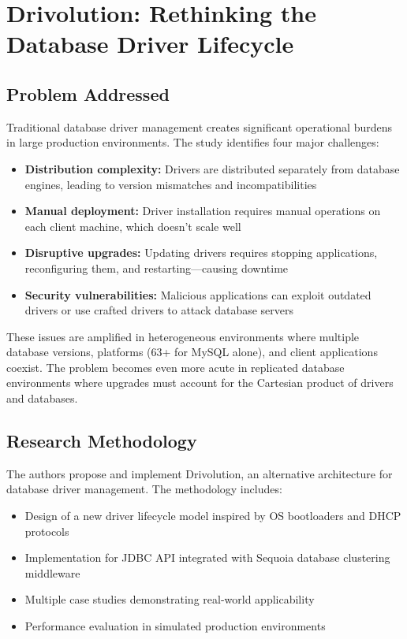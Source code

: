 \section{Drivolution: Rethinking the Database Driver Lifecycle}

\subsection{Problem Addressed}

Traditional database driver management creates significant operational burdens in large production environments. The study identifies four major challenges:

\begin{itemize}
    \item \textbf{Distribution complexity:} Drivers are distributed separately from database engines, leading to version mismatches and incompatibilities
    \item \textbf{Manual deployment:} Driver installation requires manual operations on each client machine, which doesn't scale well
    \item \textbf{Disruptive upgrades:} Updating drivers requires stopping applications, reconfiguring them, and restarting—causing downtime
    \item \textbf{Security vulnerabilities:} Malicious applications can exploit outdated drivers or use crafted drivers to attack database servers
\end{itemize}

These issues are amplified in heterogeneous environments where multiple database versions, platforms (63+ for MySQL alone), and client applications coexist. The problem becomes even more acute in replicated database environments where upgrades must account for the Cartesian product of drivers and databases.

\subsection{Research Methodology}

The authors propose and implement Drivolution, an alternative architecture for database driver management. The methodology includes:

\begin{itemize}
    \item Design of a new driver lifecycle model inspired by OS bootloaders and DHCP protocols
    \item Implementation for JDBC API integrated with Sequoia database clustering middleware
    \item Multiple case studies demonstrating real-world applicability
    \item Performance evaluation in simulated production environments
\end{itemize}

